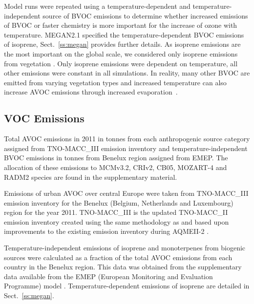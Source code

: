 Model runs were repeated using a temperature-dependent and temperature-independent source of BVOC emissions to determine whether increased emissions of BVOC or faster chemistry is more important for the increase of ozone with temperature. 
MEGAN2.1 \citep{Guenther:2012} specified the temperature-dependent BVOC emissions of isoprene, Sect.~\ref{ss:megan} provides further details. 
As isoprene emissions are the most important on the global scale, we considered only isoprene emissions from vegetation \citep{Guenther:2006}. 
Only isoprene emissions were dependent on temperature, all other emissions were constant in all simulations.
In reality, many other BVOC are emitted from varying vegetation types \citep{Guenther:2006} and increased temperature can also increase AVOC emissions through increased \mbox{evaporation \citep{Rubin:2006}}.

\subsection{VOC Emissions} \label{ss:VOC_emissions}
{%
    \renewcommand{\arraystretch}{1.1}%
    \begin{table}%
        \centering%
        \caption{Total AVOC emissions in 2011 in tonnes from each anthropogenic source category assigned from TNO-MACC\_III emission inventory and temperature-independent BVOC emissions in tonnes from Benelux region assigned from EMEP. The allocation of these emissions to MCMv3.2, CRIv2, CB05, MOZART-4 and RADM2 species are found in the supplementary material.}%
        \label{t:emissions}%
    \end{table}%
}
Emissions of urban AVOC over central Europe were taken from TNO-MACC\_III emission inventory for the Benelux (Belgium, Netherlands and Luxembourg) region for the year 2011.
TNO-MACC\_III is the updated TNO-MACC\_II emission inventory created using the same methodology as \citet{Kuenen:2014} and based upon improvements to the existing emission inventory during AQMEII-2 \citep{Pouliot:2015}. 

Temperature-independent emissions of isoprene and monoterpenes from biogenic sources were calculated as a fraction of the total AVOC emissions from each country in the Benelux region.
This data was obtained from the supplementary data available from the EMEP (European Monitoring and Evaluation Programme) model \citep{Simpson:2012}.
Temperature-dependent emissions of isoprene are detailed in Sect.~\ref{ss:megan}.

